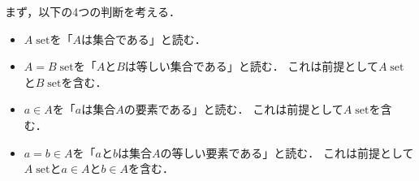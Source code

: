 \documentclass[a4paper]{ltjsarticle}
\newcommand\set{\;\mathrm{set}}
\begin{document}
まず，以下の4つの判断を考える．
\begin{itemize}
  \item $A\set$を「$A$は集合である」と読む．
  \item $A=B\set$を「$A$と$B$は等しい集合である」と読む．
    これは前提として$A\set$と$B\set$を含む．
  \item $a \in A$を「$a$は集合$A$の要素である」と読む．
    これは前提として$A\set$を含む．
  \item $a = b \in A$を「$a$と$b$は集合$A$の等しい要素である」と読む．
    これは前提として$A\set$と$a \in A$と$b \in A$を含む．
\end{itemize}
\end{document}
